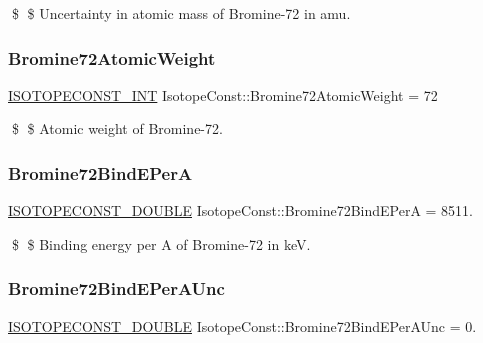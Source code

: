 \$ \$ Uncertainty in atomic mass of Bromine-\/72 in amu. \mbox{\label{group___isotope_const-_bromine-_br72_ga39798ccc235ce920a8adc406016a6920}} 
\subsubsection{\texorpdfstring{Bromine72\+Atomic\+Weight}{Bromine72AtomicWeight}}
{\footnotesize\ttfamily \mbox{\hyperlink{group___isotope_const-_macros_ga5f18360b3e99483a35c32d789e62621c}{I\+S\+O\+T\+O\+P\+E\+C\+O\+N\+S\+T\+\_\+\+I\+NT}} Isotope\+Const\+::\+Bromine72\+Atomic\+Weight = 72}

\$ \$ Atomic weight of Bromine-\/72. \mbox{\label{group___isotope_const-_bromine-_br72_gaade739c758e1b9f8e3e4a6c0aaee6b7f}} 
\subsubsection{\texorpdfstring{Bromine72\+Bind\+E\+PerA}{Bromine72BindEPerA}}
{\footnotesize\ttfamily \mbox{\hyperlink{group___isotope_const-_macros_ga8f45a7272ce02c0b4c65c44636ed719a}{I\+S\+O\+T\+O\+P\+E\+C\+O\+N\+S\+T\+\_\+\+D\+O\+U\+B\+LE}} Isotope\+Const\+::\+Bromine72\+Bind\+E\+PerA = 8511.}

\$ \$ Binding energy per A of Bromine-\/72 in keV. \mbox{\label{group___isotope_const-_bromine-_br72_ga01aa41edf3167c15a66292bf739a4628}} 
\subsubsection{\texorpdfstring{Bromine72\+Bind\+E\+Per\+A\+Unc}{Bromine72BindEPerAUnc}}
{\footnotesize\ttfamily \mbox{\hyperlink{group___isotope_const-_macros_ga8f45a7272ce02c0b4c65c44636ed719a}{I\+S\+O\+T\+O\+P\+E\+C\+O\+N\+S\+T\+\_\+\+D\+O\+U\+B\+LE}} Isotope\+Const\+::\+Bromine72\+Bind\+E\+Per\+A\+Unc = 0.}

